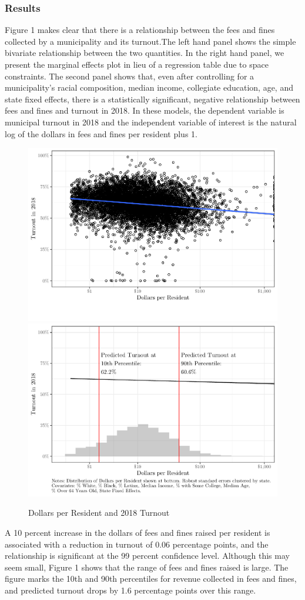 \documentclass[
  12pt,
]{article}
\begin{document}
\hypertarget{results}{%
\subsubsection*{Results}\label{results}}

Figure 1 makes clear that there is a relationship between the fees and fines collected by a municipality and its turnout.The left hand panel shows the simple bivariate relationship between the two quantities. In the right hand panel, we present the marginal effects plot in lieu of a regression table due to space constraints. The second panel shows that, even after controlling for a municipality's racial composition, median income, collegiate education, age, and state fixed effects, there is a statistically significant, negative relationship between fees and fines and turnout in 2018. In these models, the dependent variable is municipal turnout in 2018 and the independent variable of interest is the natural log of the dollars in fees and fines per resident plus 1.

\begin{figure}[H]
\includegraphics[width=0.5\linewidth]{fees_fines_to_files/figure-latex/figures-side-1} \includegraphics[width=0.5\linewidth]{fees_fines_to_files/figure-latex/figures-side-2} \caption{\label{fig:marg1}Dollars per Resident and 2018 Turnout}\label{fig:figures-side}
\end{figure}

A 10 percent increase in the dollars of fees and fines raised per resident is associated with a reduction in turnout of 0.06 percentage points, and the relationship is significant at the 99 percent confidence level. Although this may seem small, Figure 1 shows that the range of fees and fines raised is large. The figure marks the 10th and 90th percentiles for revenue collected in fees and fines, and predicted turnout drops by 1.6 percentage points over this range.
\end{document}
